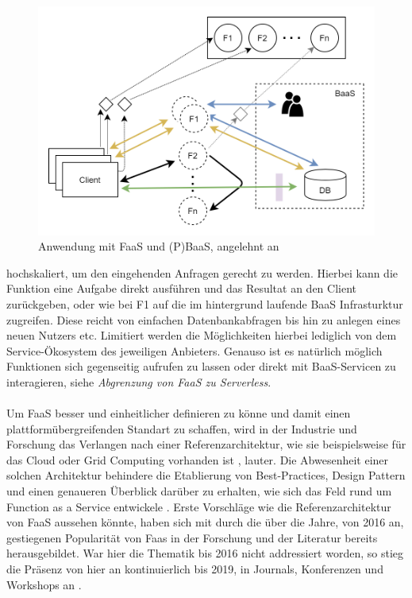 \documentclass[11pt]{article}
\begin{document}
\begin{figure}[H]
\caption{Anwendung mit FaaS und (P)BaaS, angelehnt an \cite{shafiei2020serverless}}
\label{fig:FaaSBaaSExample}
\centering
\includegraphics[width=1 \textwidth]{FaaS}
\end{figure}
hochskaliert, um den eingehenden Anfragen gerecht zu werden. Hierbei kann die Funktion eine Aufgabe direkt ausführen und das Resultat an den Client zurückgeben, oder wie bei F1 auf die im hintergrund laufende BaaS Infrasturktur zugreifen. Diese reicht von einfachen Datenbankabfragen bis hin zu anlegen eines neuen Nutzers etc. Limitiert werden die Möglichkeiten hierbei lediglich von dem Service-Ökosystem des jeweiligen Anbieters. Genauso ist es natürlich möglich Funktionen sich gegenseitig aufrufen zu lassen oder direkt mit BaaS-Servicen zu interagieren, siehe \textit{Abgrenzung von FaaS zu Serverless}. \\\\
Um FaaS besser und einheitlicher definieren zu könne und damit einen plattformübergreifenden Standart zu schaffen, wird in der Industrie und Forschung das Verlangen nach einer Referenzarchitektur, wie sie beispielsweise für das Cloud oder Grid Computing vorhanden ist \cite{liu2011nist}, \cite{foster2003grid} lauter. Die Abwesenheit einer solchen Architektur behindere die Etablierung von Best-Practices, Design Pattern und einen genaueren Überblick darüber zu erhalten, wie sich das Feld rund um Function as a Service entwickele \cite{leitner2019mixed}. Erste Vorschläge wie die Referenzarchitektur von FaaS aussehen könnte, haben sich mit \cite{van2019spec} durch die über die Jahre, von 2016 an, gestiegenen Popularität von Faas in der Forschung und der Literatur bereits herausgebildet. War hier die Thematik bis 2016 nicht addressiert worden, so stieg die Präsenz von hier an kontinuierlich bis 2019, in Journals, Konferenzen und Workshops an \cite{Yussupov2019_SystematicMappingStudyFaaS}. \\\\
\end{document}

